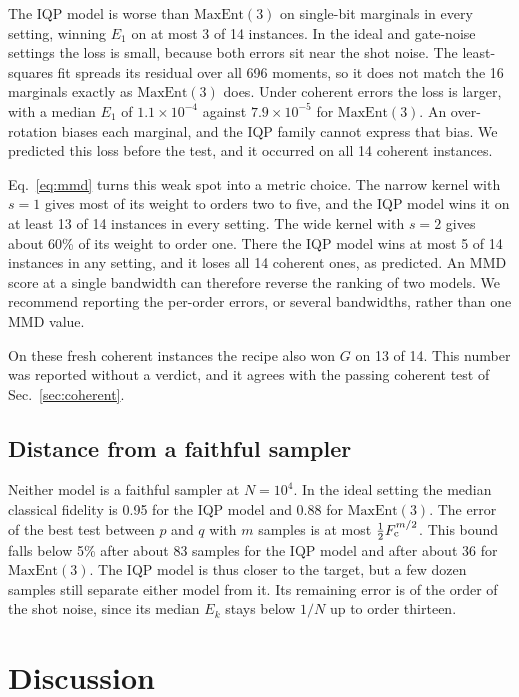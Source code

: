 \documentclass[aps,pra,twocolumn,superscriptaddress,nofootinbib]{revtex4-2}
\newcommand{\Gm}{G}
\newcommand{\ME}{\mathrm{MaxEnt}(3)}
\begin{document}
The IQP model is worse than $\ME$ on single-bit marginals in every setting, winning $E_1$ on at most 3 of 14
instances.
In the ideal and gate-noise settings the loss is small, because both errors sit near the shot noise.
The least-squares fit spreads its residual over all 696 moments, so it does not match the 16 marginals exactly as
$\ME$ does.
Under coherent errors the loss is larger, with a median $E_1$ of $1.1\times10^{-4}$ against $7.9\times10^{-5}$ for $\ME$.
An over-rotation biases each marginal, and the IQP family cannot express that bias.
We predicted this loss before the test, and it occurred on all 14 coherent instances.

Eq.~\eqref{eq:mmd} turns this weak spot into a metric choice.
The narrow kernel with $s=1$ gives most of its weight to orders two to five, and the IQP model wins it on at least 13
of 14 instances in every setting.
The wide kernel with $s=2$ gives about 60\% of its weight to order one.
There the IQP model wins at most 5 of 14 instances in any setting, and it loses all 14 coherent ones, as predicted.
An MMD score at a single bandwidth can therefore reverse the ranking of two models.
We recommend reporting the per-order errors, or several bandwidths, rather than one MMD value.

On these fresh coherent instances the recipe also won $\Gm$ on 13 of 14.
This number was reported without a verdict, and it agrees with the passing coherent test of Sec.~\ref{sec:coherent}.

\subsection{Distance from a faithful sampler}

Neither model is a faithful sampler at $N=10^4$.
In the ideal setting the median classical fidelity is 0.95 for the IQP model and 0.88 for $\ME$.
The error of the best test between $p$ and $q$ with $m$ samples is at most $\frac12 F_{\rm c}^{m/2}$.
This bound falls below 5\% after about 83 samples for the IQP model and after about 36 for $\ME$.
The IQP model is thus closer to the target, but a few dozen samples still separate either model from it.
Its remaining error is of the order of the shot noise, since its median $E_k$ stays below $1/N$ up to order
thirteen.

\section{Discussion}
\end{document}
